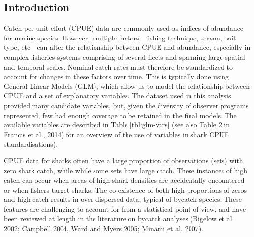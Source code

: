 
%




\subsection{Introduction}



Catch-per-unit-effort (CPUE) data are commonly used as indices of abundance for marine species. However, multiple factors---fishing technique, season, bait type, etc---can alter the relationship between CPUE and abundance, especially in complex fisheries systems comprising of several fleets and spanning large spatial and temporal scales. Nominal catch rates must therefore be standardized to account for changes in these factors over time. This is typically done using General Linear Models (GLM), which allow us to model the relationship between CPUE and a set of explanatory variables. The dataset used in this analysis provided many candidate variables, but, given the diversity of observer programs represented, few had enough coverage to be retained in the final models. The available variables are described in Table [tbl:glm-vars] (see also Table 2 in Francis et al., 2014) for an overview of the use of variables in shark CPUE standardisations).

CPUE data for sharks often have a large proportion of observations (sets) with zero shark catch, while while some sets have large catch. These instances of high catch can occur when areas of high shark densities are accidentally encountered or when fishers target sharks. The co-existence of both high proportions of zeros and high catch results in over-dispersed data, typical of bycatch species. These features are challenging to account for from a statistical point of view, and have been reviewed at length in the literature on bycatch analyses (Bigelow et al. 2002; Campbell 2004, Ward and Myers 2005; Minami et al. 2007).

